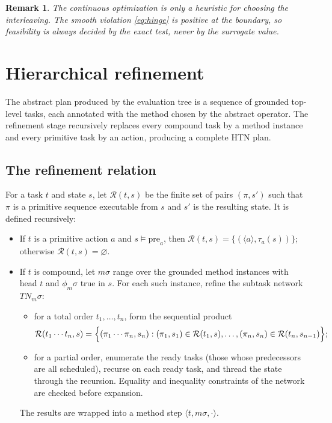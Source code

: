 \documentclass[11pt,a4paper]{article}
\newtheorem{remark}[definition]{Remark}
\newcommand{\pre}{\mathrm{pre}}
\newcommand{\cR}{\mathcal{R}}
\begin{document}
\begin{remark}
The continuous optimization is only a heuristic for \emph{choosing} the
interleaving. The smooth violation \eqref{eq:hinge} is positive at the
boundary, so feasibility is always decided by the exact test, never by the
surrogate value.
\end{remark}

\section{Hierarchical refinement}
\label{sec:refinement}

The abstract plan produced by the evaluation tree is a sequence of grounded
top-level tasks, each annotated with the method chosen by the abstract
operator. The refinement stage recursively replaces every compound task by a
method instance and every primitive task by an action, producing a complete
HTN plan.

\subsection{The refinement relation}
For a task $t$ and state $s$, let $\cR(t,s)$ be the finite set of pairs
$(\pi,s')$ such that $\pi$ is a primitive sequence executable from $s$ and
$s'$ is the resulting state. It is defined recursively:
\begin{itemize}[leftmargin=1.6em,itemsep=2pt]
\item If $t$ is a primitive action $a$ and $s\models\pre_a$, then
      $\cR(t,s)=\{(\langle a\rangle,\tau_a(s))\}$; otherwise
      $\cR(t,s)=\varnothing$.
\item If $t$ is compound, let $m\sigma$ range over the grounded method
      instances with head $t$ and $\phi_m\sigma$ true in $s$. For each such
      instance, refine the subtask network $TN_m\sigma$:
      \begin{itemize}[leftmargin=1.2em,itemsep=1pt]
      \item for a total order $t_1,\dots,t_n$, form the sequential product
            \[
            \cR(t_1\cdots t_n,s)
            =\Bigl\{(\pi_1\cdots\pi_n,s_n):
            (\pi_1,s_1)\in\cR(t_1,s),\dots,(\pi_n,s_n)\in\cR(t_n,s_{n-1})\Bigr\};
            \]
      \item for a partial order, enumerate the ready tasks (those whose
            predecessors are all scheduled), recurse on each ready task, and
            thread the state through the recursion. Equality and inequality
            constraints of the network are checked before expansion.
      \end{itemize}
      The results are wrapped into a method step
      $\langle t,m\sigma,\cdot\rangle$.
\end{itemize}
\end{document}
